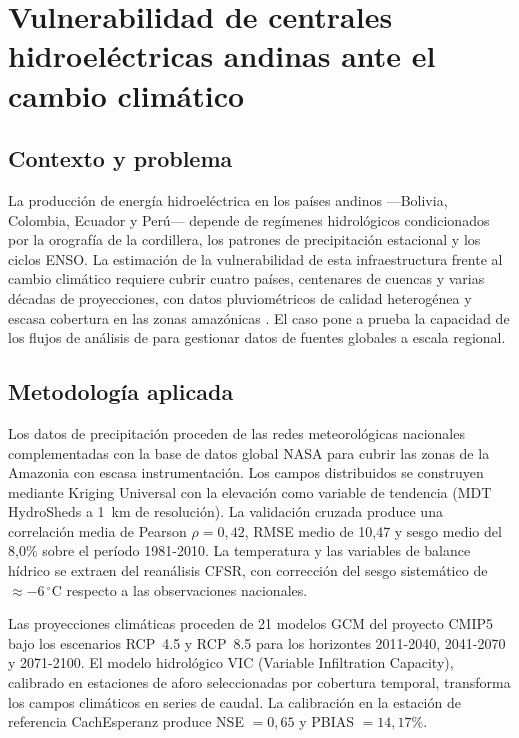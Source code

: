 \clearpage
\section{Vulnerabilidad de centrales hidroeléctricas andinas ante el cambio climático}
\label{sec:caso_andes}

\subsection{Contexto y problema}

La producción de energía hidroeléctrica en los países andinos ---Bolivia, Colombia, Ecuador y Perú--- depende de regímenes hidrológicos condicionados por la orografía de la cordillera, los patrones de precipitación estacional y los ciclos ENSO. La estimación de la vulnerabilidad de esta infraestructura frente al cambio climático requiere cubrir cuatro países, centenares de cuencas y varias décadas de proyecciones, con datos pluviométricos de calidad heterogénea y escasa cobertura en las zonas amazónicas \parencite{deljesus2019andean}. El caso pone a prueba la capacidad de los flujos de análisis de \hydra para gestionar datos de fuentes globales a escala regional.

\subsection{Metodología aplicada}

Los datos de precipitación proceden de las redes meteorológicas nacionales complementadas con la base de datos global NASA para cubrir las zonas de la Amazonia con escasa instrumentación. Los campos distribuidos se construyen mediante Kriging Universal con la elevación como variable de tendencia (MDT HydroSheds a 1~km de resolución). La validación cruzada produce una correlación media de Pearson $\rho = 0{,}42$, RMSE medio de 10,47 y sesgo medio del 8{,}0\% sobre el período 1981-2010. La temperatura y las variables de balance hídrico se extraen del reanálisis CFSR, con corrección del sesgo sistemático de $\approx -6\,^\circ$C respecto a las observaciones nacionales.

Las proyecciones climáticas proceden de 21 modelos GCM del proyecto CMIP5 bajo los escenarios RCP~4.5 y RCP~8.5 para los horizontes 2011-2040, 2041-2070 y 2071-2100. El modelo hidrológico VIC (Variable Infiltration Capacity), calibrado en estaciones de aforo seleccionadas por cobertura temporal, transforma los campos climáticos en series de caudal. La calibración en la estación de referencia CachEsperanz produce NSE $= 0{,}65$ y PBIAS $= 14{,}17\%$.

